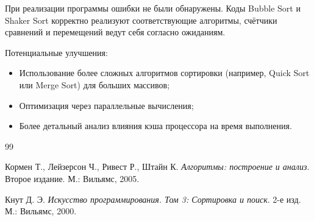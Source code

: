 \documentclass[a4paper,12pt,titlepage]{article}
\begin{document}
При реализации программы ошибки не были обнаружены. Коды Bubble Sort и Shaker Sort корректно реализуют соответствующие алгоритмы, счётчики сравнений и перемещений ведут себя согласно ожиданиям.

Потенциальные улучшения:
\begin{itemize}
    \item Использование более сложных алгоритмов сортировки (например, Quick Sort или Merge Sort) для больших массивов;
    \item Оптимизация через параллельные вычисления;
    \item Более детальный анализ влияния кэша процессора на время выполнения.
\end{itemize}

\newpage

\begin{raggedright}
\begin{thebibliography}{99}

 Кормен Т., Лейзерсон Ч., Ривест Р., Штайн К. 
    \textit{Алгоритмы: построение и анализ}. 
    Второе издание. М.: Вильямс, 2005.

 Кнут Д. Э. 
    \textit{Искусство программирования. Том 3: Сортировка и поиск}. 
    2-е изд. М.: Вильямс, 2000.

\end{thebibliography}
\end{raggedright}
\end{document}
